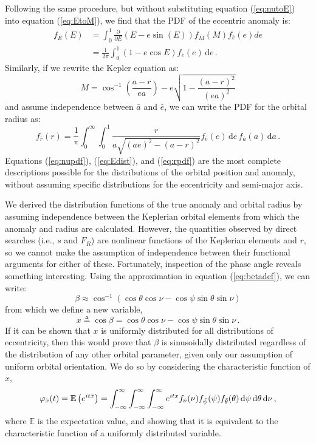 Following the same procedure, but without substituting equation (\ref{eq:nutoE}) into equation (\ref{eq:EtoM}), we find that the PDF of the eccentric anomaly is:
\begin{align}
f_{\bar{E}}(E) &=  \int_{0}^{1} \frac{\partial }{\partial E}\left( E - e\sin(E) \right)f_{\bar{M}}(M)f_{\bar{e}}(e)de \nonumber\\
& = \frac{1}{2\pi}\int_{0}^{1} \left(1-e\cos E\right) f_{\bar{e}}(e)\, \mathrm{d}e \,. \label{eq:Edist}
\end{align}
Similarly, if we rewrite the Kepler equation as:
\begin{equation}
M = \cos^{-1}\left(\frac{a - r}{ea}\right) - e\sqrt{1 - \frac{(a-r)^2}{(ea)^2}}
\end{equation}
and assume independence between $\bar a$ and $\bar e$, we can write the PDF for the orbital radius as:
\begin{equation}\label{eq:rpdf}
f_{\bar{r}}(r) = \frac{1}{\pi}\int_{0}^{\infty} \int_{0}^{1} \frac{r}{a\sqrt{(ae)^2 - (a-r)^2}}f_{\bar{e}}(e) \, \mathrm{d}e \, f_{\bar{a}}(a)\, \mathrm{d}a \,.
\end{equation}
Equations (\ref{eq:nupdf}), (\ref{eq:Edist}), and (\ref{eq:rpdf}) are the most complete descriptions possible for the distributions of the orbital position and anomaly, without assuming specific distributions for the eccentricity and semi-major axis.

We derived the distribution functions of the true anomaly and orbital radius by assuming independence between the Keplerian orbital elements from which the anomaly and radius are calculated.  However, the quantities observed by direct searches (i.e., $s$ and $F_R$) are nonlinear functions of the Keplerian elements and $r$, so we cannot make the assumption of independence between their functional arguments for either of these.  Fortunately, inspection of the phase angle reveals something interesting.  Using the approximation in equation (\ref{eq:betadef}), we can write:
\begin{equation}
\beta \approx \cos^{-1}\left(\cos\theta  \cos\nu -\cos\psi  \sin\theta  \sin\nu \right) 
\end{equation}
from which we define a new variable,
\begin{equation} \label{eq:cosBeta}
x \triangleq \cos\beta = \cos\theta  \cos\nu -\cos\psi  \sin\theta  \sin\nu \,.
\end{equation}
If it can be shown that $x$ is uniformly distributed for all distributions of eccentricity, then this would prove that $\beta$ is sinusoidally distributed regardless of the distribution of any other orbital parameter, given only our assumption of uniform orbital orientation.  We do so by considering the characteristic function of $x$,
\begin{equation}
\varphi_{\bar{x}}(t) =  \mathbb{E}\left(e^{i t \bar{x}}\right) = \int_{-\infty}^{\infty} \int_{-\infty}^{\infty} \int_{-\infty}^{\infty} e^{i t x} f_{\bar\nu}(\nu) f_{\bar\psi}(\psi) f_{\bar\theta}(\theta)  \,\mathrm{d}\psi \,\mathrm{d}\theta \,\mathrm{d}\nu \,,
\end{equation}
where $\mathbb{E}$ is the expectation value, and showing that it is equivalent to the characteristic function of a uniformly distributed variable.

